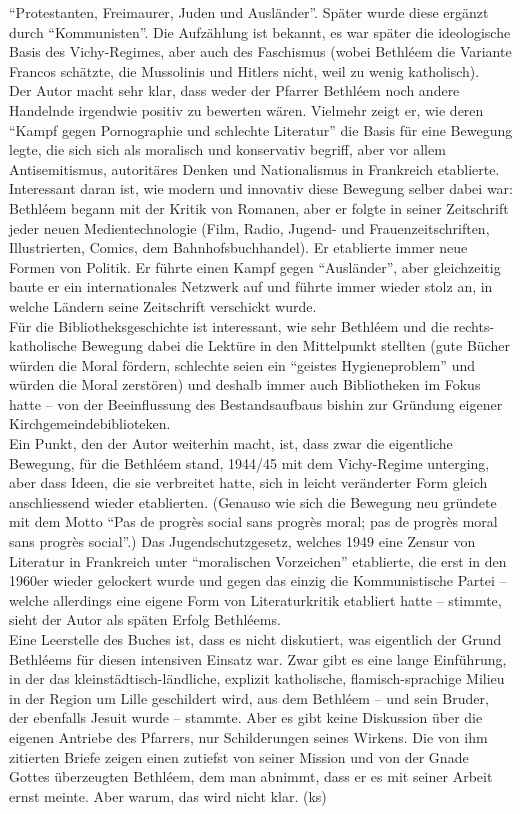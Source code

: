 \documentclass[a4paper,
fontsize=11pt,
oneside,
numbers=noperiodatend,
parskip=half-,
bibliography=totoc,
final
]{scrartcl}
\begin{document}
``Protestanten, Freimaurer, Juden und Ausländer''. Später wurde diese
ergänzt durch ``Kommunisten''. Die Aufzählung ist bekannt, es war später
die ideologische Basis des Vichy-Regimes, aber auch des Faschismus
(wobei Bethléem die Variante Francos schätzte, die Mussolinis und
Hitlers nicht, weil zu wenig katholisch).\\
Der Autor macht sehr klar, dass weder der Pfarrer Bethléem noch andere
Handelnde irgendwie positiv zu bewerten wären. Vielmehr zeigt er, wie
deren ``Kampf gegen Pornographie und schlechte Literatur'' die Basis für
eine Bewegung legte, die sich sich als moralisch und konservativ
begriff, aber vor allem Antisemitismus, autoritäres Denken und
Nationalismus in Frankreich etablierte. Interessant daran ist, wie
modern und innovativ diese Bewegung selber dabei war: Bethléem begann
mit der Kritik von Romanen, aber er folgte in seiner Zeitschrift jeder
neuen Medientechnologie (Film, Radio, Jugend- und Frauenzeitschriften,
Illustrierten, Comics, dem Bahnhofsbuchhandel). Er etablierte immer neue
Formen von Politik. Er führte einen Kampf gegen ``Ausländer'', aber
gleichzeitig baute er ein internationales Netzwerk auf und führte immer
wieder stolz an, in welche Ländern seine Zeitschrift verschickt wurde.\\
Für die Bibliotheksgeschichte ist interessant, wie sehr Bethléem und die
rechts-katholische Bewegung dabei die Lektüre in den Mittelpunkt
stellten (gute Bücher würden die Moral fördern, schlechte seien ein
``geistes Hygieneproblem'' und würden die Moral zerstören) und deshalb
immer auch Bibliotheken im Fokus hatte -- von der Beeinflussung des
Bestandsaufbaus bishin zur Gründung eigener Kirchgemeindebiblioteken.\\
Ein Punkt, den der Autor weiterhin macht, ist, dass zwar die eigentliche
Bewegung, für die Bethléem stand, 1944/45 mit dem Vichy-Regime
unterging, aber dass Ideen, die sie verbreitet hatte, sich in leicht
veränderter Form gleich anschliessend wieder etablierten. (Genauso wie
sich die Bewegung neu gründete mit dem Motto ``Pas de progrès social
sans progrès moral; pas de progrès moral sans progrès social''.) Das
Jugendschutzgesetz, welches 1949 eine Zensur von Literatur in Frankreich
unter ``moralischen Vorzeichen'' etablierte, die erst in den 1960er
wieder gelockert wurde und gegen das einzig die Kommunistische Partei --
welche allerdings eine eigene Form von Literaturkritik etabliert hatte
-- stimmte, sieht der Autor als späten Erfolg Bethléems.\\
Eine Leerstelle des Buches ist, dass es nicht diskutiert, was eigentlich
der Grund Bethléems für diesen intensiven Einsatz war. Zwar gibt es eine
lange Einführung, in der das kleinstädtisch-ländliche, explizit
katholische, flamisch-sprachige Milieu in der Region um Lille
geschildert wird, aus dem Bethléem -- und sein Bruder, der ebenfalls
Jesuit wurde -- stammte. Aber es gibt keine Diskussion über die eigenen
Antriebe des Pfarrers, nur Schilderungen seines Wirkens. Die von ihm
zitierten Briefe zeigen einen zutiefst von seiner Mission und von der
Gnade Gottes überzeugten Bethléem, dem man abnimmt, dass er es mit
seiner Arbeit ernst meinte. Aber warum, das wird nicht klar. (ks)
\end{document}
